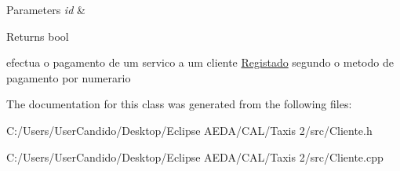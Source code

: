 \begin{DoxyParams}{Parameters}
{\em id} & \\
\hline
\end{DoxyParams}
\begin{DoxyReturn}{Returns}
bool
\end{DoxyReturn}
efectua o pagamento de um servico a um cliente \hyperlink{class_registado}{Registado} segundo o metodo de pagamento por numerario 

The documentation for this class was generated from the following files\+:\begin{DoxyCompactItemize}
\item 
C\+:/\+Users/\+User\+Candido/\+Desktop/\+Eclipse A\+E\+D\+A/\+C\+A\+L/\+Taxis 2/src/Cliente.\+h\item 
C\+:/\+Users/\+User\+Candido/\+Desktop/\+Eclipse A\+E\+D\+A/\+C\+A\+L/\+Taxis 2/src/Cliente.\+cpp\end{DoxyCompactItemize}
